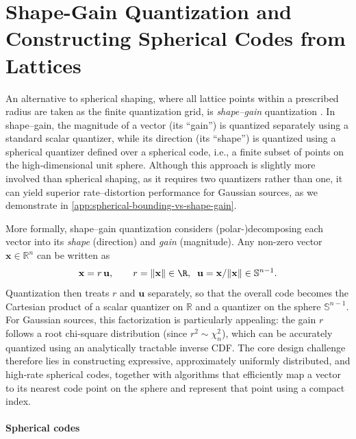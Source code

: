 \documentclass{article}
\theoremstyle{plain}
\theoremstyle{definition}
\theoremstyle{remark}
\begin{document}
\newpage
\section{Shape-Gain Quantization and Constructing Spherical Codes from Lattices}
\label{sec:shape-gain}

An alternative to spherical shaping, where all lattice points within a prescribed radius are taken as the finite quantization grid, is \textit{shape–gain} quantization \citep{sabin1982product,hamkins2002gaussian,gersho2012vector}. In shape–gain, the magnitude of a vector (its “gain”) is quantized separately using a standard scalar quantizer, while its direction (its “shape”) is quantized using a spherical quantizer defined over a spherical code, i.e., a finite subset of points on the high‑dimensional unit sphere. Although this approach is slightly more involved than spherical shaping, as it requires two quantizers rather than one, it can yield superior rate–distortion performance for Gaussian sources, as we demonstrate in \autoref{app:spherical-bounding-vs-shape-gain}.

More formally, shape–gain quantization considers (polar-)decomposing each vector into its \emph{shape} (direction) and \emph{gain} (magnitude). Any non-zero vector $\mathbf{x}\in\mathbb{R}^n$ can be written as
\begin{align}
\mathbf{x} = r\,\mathbf{u},
\qquad
r=\|\mathbf{x}\| \in \R,\;\; \mathbf{u}=\mathbf{x}/\|\mathbf{x}\|\in\mathbb{S}^{n-1}.
\end{align}
Quantization then treats $r$ and $\mathbf{u}$ separately, so that the overall code becomes the Cartesian product of a scalar quantizer on $\mathbb{R}$ and a quantizer on the sphere $\mathbb{S}^{n-1}$. For Gaussian sources, this factorization is particularly appealing: the gain $r$ follows a root chi‑square distribution (since $r^2 \sim \chi^2_n$), which can be accurately quantized using an analytically tractable inverse CDF. The core design challenge therefore lies in constructing expressive, approximately uniformly distributed, and high‑rate spherical codes, together with algorithms that efficiently map a vector to its nearest code point on the sphere and represent that point using a compact index.

\paragraph{Spherical codes}
\end{document}
